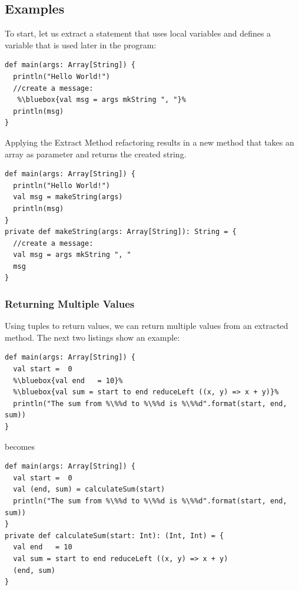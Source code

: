 \documentclass[10pt,a4paper,oneside]{scrreprt}
\begin{document}
\subsection{Examples}

To start, let us extract a statement that uses local variables and defines a variable that is used later in the program:

\begin{lstlisting}
def main(args: Array[String]) {
  println("Hello World!")
  //create a message:
   %\bluebox{val msg = args mkString ", "}%
  println(msg)
}
\end{lstlisting}

Applying the Extract Method refactoring results in a new method that takes an array as parameter and returns the created string.

\begin{lstlisting}
def main(args: Array[String]) {
  println("Hello World!")
  val msg = makeString(args)
  println(msg)
}
private def makeString(args: Array[String]): String = {
  //create a message:
  val msg = args mkString ", "
  msg
}
\end{lstlisting}

\subsubsection{Returning Multiple Values}

Using tuples to return values, we can return multiple values from an extracted method. The next two listings show an example:

\begin{lstlisting}    
def main(args: Array[String]) {
  val start =  0
  %\bluebox{val end   = 10}%
  %\bluebox{val sum = start to end reduceLeft ((x, y) => x + y)}%
  println("The sum from %\%%d to %\%%d is %\%%d".format(start, end, sum))
}
\end{lstlisting}

becomes

\begin{lstlisting}        
def main(args: Array[String]) {
  val start =  0
  val (end, sum) = calculateSum(start)
  println("The sum from %\%%d to %\%%d is %\%%d".format(start, end, sum))
}
private def calculateSum(start: Int): (Int, Int) = {
  val end   = 10
  val sum = start to end reduceLeft ((x, y) => x + y)
  (end, sum)
}
\end{lstlisting}
\end{document}
